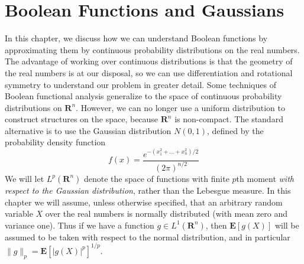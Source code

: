 \chapter{Boolean Functions and Gaussians}

In this chapter, we discuss how we can understand Boolean functions by approximating them by continuous probability distributions on the real numbers. The advantage of working over continuous distributions is that the geometry of the real numbers is at our disposal, so we can use differentiation and rotational symmetry to understand our problem in greater detail. Some techniques of Boolean functional analysis generalize to the space of continuous probability distributions on $\mathbf{R}^n$. However, we can no longer use a uniform distribution to construct structures on the space, because $\mathbf{R}^n$ is non-compact. The standard alternative is to use the Gaussian distribution $N(0,1)$, defined by the probability density function
%
\[ f(x) = \frac{e^{-(x_1^2 + \dots + x_n^2)/2}}{(2 \pi)^{n/2}} \]
%
We will let $L^p(\mathbf{R}^n)$ denote the space of functions with finite $p$th moment {\it with respect to the Gaussian distribution}, rather than the Lebesgue measure. In this chapter we will assume, unless otherwise specified, that an arbitrary random variable $X$ over the real numbers is normally distributed (with mean zero and variance one). Thus if we have a function $g \in L^1(\mathbf{R}^n)$, then $\mathbf{E}[g(X)]$ will be assumed to be taken with respect to the normal distribution, and in particular $\| g \|_p = \mathbf{E}[|g(X)|^p]^{1/p}$.

